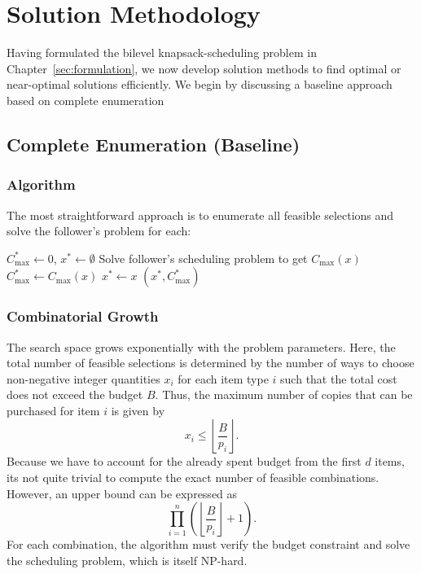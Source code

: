 \chapter{Solution Methodology}
\label{sec:methodology}

Having formulated the bilevel knapsack-scheduling problem in Chapter~\ref{sec:formulation}, we now develop solution methods to find optimal or near-optimal solutions efficiently. We begin by discussing a baseline approach based on complete enumeration
\section{Complete Enumeration (Baseline)}

\subsection{Algorithm}

The most straightforward approach is to enumerate all feasible selections and solve the follower's problem for each:

\begin{algorithm}
\caption{Complete Enumeration for Bilevel Problem}
\label{alg:enumeration}
\begin{algorithmic}[1]
\State $C_{\max}^* \gets 0$, $x^* \gets \emptyset$
    \State Solve follower's scheduling problem to get $C_{\max}(x)$
        \State $C_{\max}^* \gets C_{\max}(x)$
        \State $x^* \gets x$
    \EndIf
\EndFor
\State \Return $(x^*, C_{\max}^*)$
\end{algorithmic}
\end{algorithm}

\subsection{Combinatorial Growth}


The search space grows exponentially with the problem parameters. 
Here, the total number of feasible selections is determined by the number of ways to choose non-negative integer quantities $x_i$ for each item type $i$ such that the total cost does not exceed the budget $B$.
Thus, the maximum number of copies that can be purchased for item $i$ is given by
\[
x_i \leq \left\lfloor \frac{B}{p_i} \right\rfloor.
\]
Because we have to account for the already spent budget from the first $d$ items, its not quite trivial to compute the exact number of feasible combinations. However, an upper bound can be expressed as
\[
\prod_{i=1}^{n} \left( \left\lfloor \frac{B}{p_i} \right\rfloor + 1 \right).
\]
For each combination, the algorithm must verify the budget constraint and solve the scheduling problem, which is itself NP-hard.

